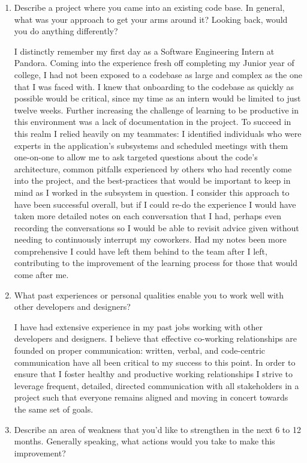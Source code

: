 \documentclass[9pt,letterpaper]{article}
\begin{document}
\begin{enumerate}
	\item Describe a project where you came into an existing code base. In general, what was your approach to get your arms around it? Looking back, would you do anything differently?

		I distinctly remember my first day as a Software Engineering Intern at Pandora. Coming into the experience fresh off completing my Junior year of college, I had not been exposed to a codebase as large and complex as the one that I was faced with. I knew that onboarding to the codebase as quickly as possible would be critical, since my time as an intern would be limited to just twelve weeks. Further increasing the challenge of learning to be productive in this environment was a lack of documentation in the project. To succeed in this realm I relied heavily on my teammates: I identified individuals who were experts in the application's subsystems and scheduled meetings with them one-on-one to allow me to ask targeted questions about the code's architecture, common pitfalls experienced by others who had recently come into the project, and the best-practices that would be important to keep in mind as I worked in the subsystem in question. I consider this approach to have been successful overall, but if I could re-do the experience I would have taken more detailed notes on each conversation that I had, perhaps even recording the conversations so I would be able to revisit advice given without needing to continuously interrupt my coworkers. Had my notes been more comprehensive I could have left them behind to the team after I left, contributing to the improvement of the learning process for those that would come after me.

	\item What past experiences or personal qualities enable you to work well with other developers and designers?

		I have had extensive experience in my past jobs working with other developers and designers. I believe that effective co-working relationships are founded on proper communication: written, verbal, and code-centric communication have all been critical to my success to this point. In order to ensure that I foster healthy and productive working relationships I strive to leverage frequent, detailed, directed communication with all stakeholders in a project such that everyone remains aligned and moving in concert towards the same set of goals.

	\item Describe an area of weakness that you'd like to strengthen in the next 6 to 12 months. Generally speaking, what actions would you take to make this improvement?


\end{enumerate}
\end{document}
